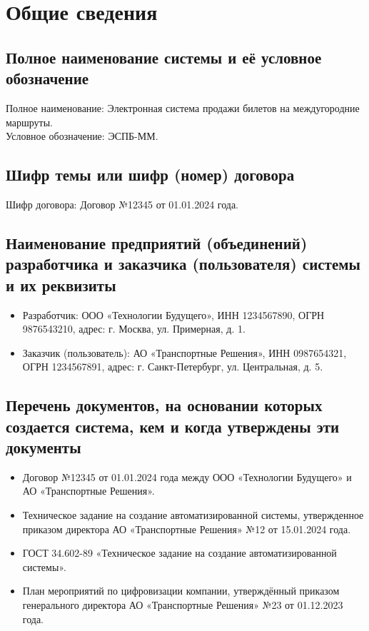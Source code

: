 \section{Общие сведения}

\subsection{Полное наименование системы и её условное обозначение}
\noindent Полное наименование: Электронная система продажи билетов на междугородние
маршруты. \\
\noindent Условное обозначение: ЭСПБ-ММ.

\subsection{Шифр темы или шифр (номер) договора}
\noindent Шифр договора: Договор №12345 от 01.01.2024 года. \\

\subsection{Наименование предприятий (объединений) разработчика и заказчика
(пользователя) системы и их реквизиты}
\begin{itemize}
    \item Разработчик: ООО «Технологии Будущего», ИНН 1234567890, ОГРН
    9876543210, адрес: г. Москва, ул. Примерная, д. 1.
    \item Заказчик (пользователь): АО «Транспортные Решения», ИНН 0987654321,
    ОГРН 1234567891, адрес: г. Санкт-Петербург, ул. Центральная, д. 5.
\end{itemize}

\subsection{Перечень документов, на основании которых создается система, кем и
когда утверждены эти документы}
\begin{itemize}
    \item Договор №12345 от 01.01.2024 года между ООО «Технологии Будущего» и АО
    «Транспортные Решения».
    \item Техническое задание на создание автоматизированной системы,
    утвержденное приказом директора АО «Транспортные Решения» №12 от 15.01.2024
    года.
    \item ГОСТ 34.602-89 «Техническое задание на создание автоматизированной
    системы».
    \item План мероприятий по цифровизации компании, утверждённый приказом
    генерального директора АО «Транспортные Решения» №23 от 01.12.2023 года.
\end{itemize}

